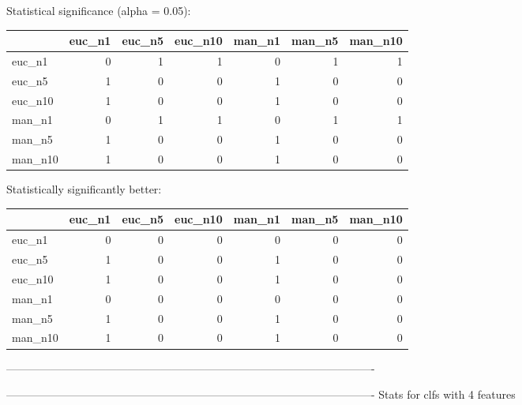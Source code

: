 Statistical significance (alpha = 0.05):
 \begin{tabular}{lrrrrrr}
\hline
         &   euc\_n1 &   euc\_n5 &   euc\_n10 &   man\_n1 &   man\_n5 &   man\_n10 \\
\hline
 euc\_n1  &        0 &        1 &         1 &        0 &        1 &         1 \\
 euc\_n5  &        1 &        0 &         0 &        1 &        0 &         0 \\
 euc\_n10 &        1 &        0 &         0 &        1 &        0 &         0 \\
 man\_n1  &        0 &        1 &         1 &        0 &        1 &         1 \\
 man\_n5  &        1 &        0 &         0 &        1 &        0 &         0 \\
 man\_n10 &        1 &        0 &         0 &        1 &        0 &         0 \\
\hline
\end{tabular} 

Statistically significantly better:
 \begin{tabular}{lrrrrrr}
\hline
         &   euc\_n1 &   euc\_n5 &   euc\_n10 &   man\_n1 &   man\_n5 &   man\_n10 \\
\hline
 euc\_n1  &        0 &        0 &         0 &        0 &        0 &         0 \\
 euc\_n5  &        1 &        0 &         0 &        1 &        0 &         0 \\
 euc\_n10 &        1 &        0 &         0 &        1 &        0 &         0 \\
 man\_n1  &        0 &        0 &         0 &        0 &        0 &         0 \\
 man\_n5  &        1 &        0 &         0 &        1 &        0 &         0 \\
 man\_n10 &        1 &        0 &         0 &        1 &        0 &         0 \\
\hline
\end{tabular} 

----------------------------------------------------------------------------------------------------



----------------------------------------------------------------------------------------------------
Stats for clfs with 4 features



